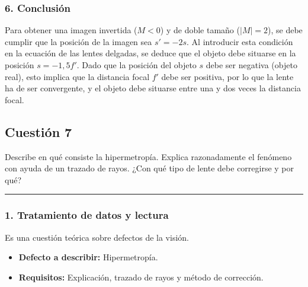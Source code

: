 \subsubsection*{6. Conclusión}
\begin{cajaconclusion}
Para obtener una imagen invertida ($M<0$) y de doble tamaño ($|M|=2$), se debe cumplir que la posición de la imagen sea $s'=-2s$. Al introducir esta condición en la ecuación de las lentes delgadas, se deduce que el objeto debe situarse en la posición $s = -1,5 f'$. Dado que la posición del objeto $s$ debe ser negativa (objeto real), esto implica que la distancia focal $f'$ debe ser positiva, por lo que la lente ha de ser convergente, y el objeto debe situarse entre una y dos veces la distancia focal.
\end{cajaconclusion}

\newpage
\subsection{Cuestión 7}
\label{subsec:C7_2021_jul_ext}

\begin{cajaenunciado}
Describe en qué consiste la hipermetropía. Explica razonadamente el fenómeno con ayuda de un trazado de rayos. ¿Con qué tipo de lente debe corregirse y por qué?
\end{cajaenunciado}
\hrule

\subsubsection*{1. Tratamiento de datos y lectura}
Es una cuestión teórica sobre defectos de la visión.
\begin{itemize}
    \item \textbf{Defecto a describir:} Hipermetropía.
    \item \textbf{Requisitos:} Explicación, trazado de rayos y método de corrección.
\end{itemize}

